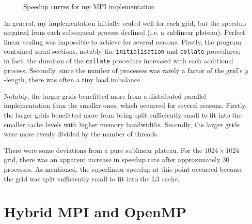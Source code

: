 \documentclass[twocolumn, a4paper]{article}
\begin{document}
\begin{figure}[htpb]
{
  }
  \caption{Speedup curves for my MPI implementation}\label{fig:scaling}
\end{figure}

In general, my implementation initially scaled well for each grid, but the speedup acquired from each subsequent process declined (i.e. a sublinear plateau).
Perfect linear scaling was impossible to achieve for several reasons.
Firstly, the program contained serial sections, notably the \texttt{initialisation} and \texttt{collate} procedures; in fact, the duration of the \texttt{collate} procedure increased with each additional process.
Secondly, since the number of processes was rarely a factor of the grid's $y$-length, there was often a tiny load imbalance.

Notably, the larger grids benefitted more from a distributed parallel implementation than the smaller ones, which occurred for several reasons.
Firstly, the larger grids benefitted more from being split sufficiently small to fit into the smaller cache levels with higher memory bandwidths.
Secondly, the larger grids were more evenly divided by the number of threads.

There were some deviations from a pure sublinear plateau.
For the $1024\times1024$ grid, there was an apparent increase in speedup rate after approximately 30 processes.
As mentioned, the superlinear speedup at this point occurred because the grid was split sufficiently small to fit into the L3 cache.

\section{Hybrid MPI and OpenMP}
\end{document}
